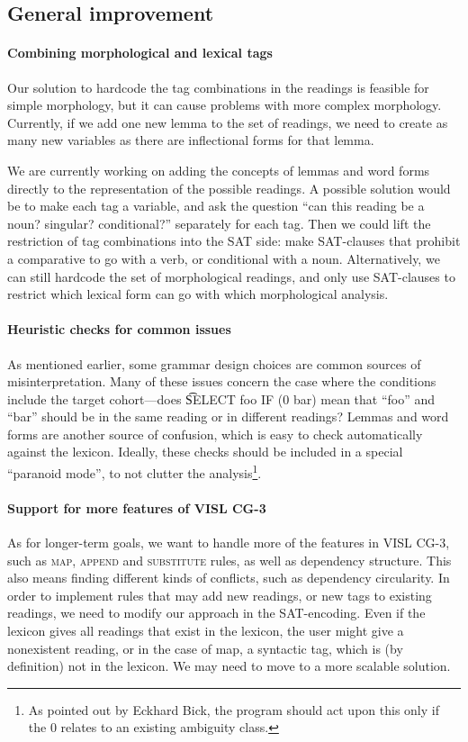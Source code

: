 {{\subsection{General improvement}

\paragraph{Combining morphological and lexical tags}

Our solution to hardcode the tag combinations in the readings is
feasible for simple morphology, but it can cause problems with more
complex morphology.
Currently, if we add one new lemma to the set of readings, we need to
create as many new variables as there are inflectional forms
for that lemma. %

We are currently working on adding the concepts of lemmas and word
forms directly to the representation of the possible readings.
A possible solution would be to make each tag a variable, and ask the
question ``can this reading be a noun? singular? 
conditional?'' separately for each tag. Then we could lift the
restriction of tag combinations into the SAT side: make SAT-clauses
that prohibit a comparative to go with a verb, or conditional with a noun.
Alternatively, we can still hardcode the set of morphological readings, and 
only use SAT-clauses to restrict which lexical form can go with which morphological analysis.

\paragraph{Heuristic checks for common issues} 
As mentioned earlier, some grammar design choices  
are common sources of misinterpretation.
Many of these issues concern the case where the conditions include 
the target cohort---does \t{SELECT foo IF (0 bar)} mean that ``foo'' and ``bar'' 
should be in the same reading or in different readings? 
Lemmas and word forms are another source of confusion, which is easy to check automatically against the lexicon. 
Ideally, these checks should be included in a special ``paranoid mode'', to not clutter the analysis\footnote{As pointed out by Eckhard Bick, the program should act upon this only if the 0 relates to an existing ambiguity class.}.


\paragraph{Support for more features of VISL CG-3}
As for longer-term goals, we want to handle more of the features in VISL CG-3,
such as \textsc{map}, \textsc{append} and
\textsc{substitute} rules, as well as dependency structure. 
This also means finding different kinds of conflicts, such as dependency circularity.
In order to implement rules that may add new readings, or new tags to
existing readings, we need to modify our approach in the SAT-encoding.
Even if the lexicon gives all readings that exist in the lexicon, the
user might give a nonexistent reading, or in the case of {\sc map}, a
syntactic tag, which is (by definition) not in the lexicon. We may need to move
to a more scalable solution.

}}

